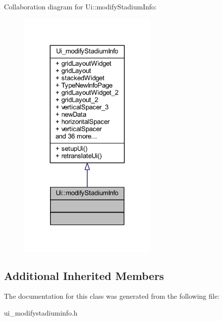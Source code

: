 Collaboration diagram for Ui\+:\+:modify\+Stadium\+Info\+:\nopagebreak
\begin{figure}[H]
\begin{center}
\leavevmode
\includegraphics[width=192pt]{class_ui_1_1modify_stadium_info__coll__graph}
\end{center}
\end{figure}
\subsection*{Additional Inherited Members}


The documentation for this class was generated from the following file\+:\begin{DoxyCompactItemize}
\item 
ui\+\_\+modifystadiuminfo.\+h\end{DoxyCompactItemize}
